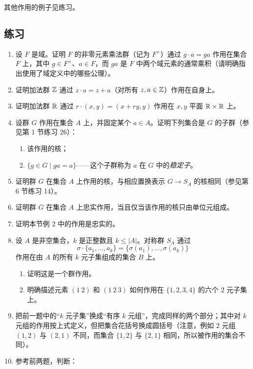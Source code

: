 其他作用的例子见练习。

\subsection*{练习}
\begin{enumerate}[label=\arabic*.]
  \item 设 $F$ 是域。证明 $F$ 的非零元素乘法群（记为 $F^\times$）通过 $g\cdot a=ga$ 作用在集合 $F$ 上，其中 $g\in F^\times$、$a\in F$，而 $ga$ 是 $F$ 中两个域元素的通常乘积（请明确指出使用了域定义中的哪些公理）。
  \item 证明加法群 $\mathbb{Z}$ 通过 $z\cdot a=z+a$（对所有 $z,a\in\mathbb{Z}$）作用在自身上。
  \item 证明加法群 $\mathbb{R}$ 通过 $r\cdot(x,y)=(x+ry,y)$ 作用在 $x,y$ 平面 $\mathbb{R}\times\mathbb{R}$ 上。
  \item 设群 $G$ 作用在集合 $A$ 上，并固定某个 $a\in A$。证明下列集合是 $G$ 的子群（参见第 1 节练习 26）：
  \begin{enumerate}[label=(\alph*)]
    \item 该作用的核；
    \item $\{g\in G\mid ga=a\}$——这个子群称为 $a$ 在 $G$ 中的\emph{稳定子}。
  \end{enumerate}
  \item 证明群 $G$ 在集合 $A$ 上作用的核，与相应置换表示 $G\to S_A$ 的核相同（参见第 6 节练习 14）。
  \item 证明群 $G$ 在集合 $A$ 上忠实作用，当且仅当该作用的核只由单位元组成。
  \item 证明本节例 2 中的作用是忠实的。
  \item 设 $A$ 是非空集合，$k$ 是正整数且 $k\leq |A|$。对称群 $S_A$ 通过
  \[
    \sigma\cdot\{a_1,\ldots,a_k\}=\{\sigma(a_1),\ldots,\sigma(a_k)\}
  \]
  作用在由 $A$ 的所有 $k$ 元子集组成的集合 $B$ 上。
  \begin{enumerate}[label=(\alph*)]
    \item 证明这是一个群作用。
    \item 明确描述元素 $(1\ 2)$ 和 $(1\ 2\ 3)$ 如何作用在 $\{1,2,3,4\}$ 的六个 $2$ 元子集上。
  \end{enumerate}
  \item 把前一题中的“$k$ 元子集”换成“有序 $k$ 元组”，完成同样的两个部分；其中对 $k$ 元组的作用按上式定义，但把集合花括号换成圆括号（注意，例如 $2$ 元组 $(1,2)$ 与 $(2,1)$ 不同，而集合 $\{1,2\}$ 与 $\{2,1\}$ 相同，所以被作用的集合不同）。
  \item 参考前两题，判断：
  \begin{enumerate}[label=(\alph*)]

\end{enumerate}
\end{enumerate}
